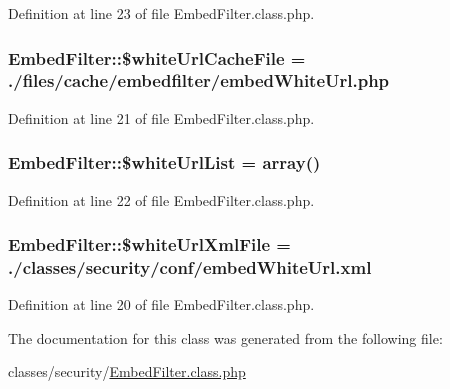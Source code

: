 Definition at line 23 of file Embed\+Filter.\+class.\+php.

\hypertarget{classEmbedFilter_a2c04bd8059ab27b14923923317ad0756}{}
\subsubsection[{\$white\+Url\+Cache\+File}]{\setlength{\rightskip}{0pt plus 5cm}Embed\+Filter\+::\$white\+Url\+Cache\+File = \textquotesingle{}./files/cache/embedfilter/embed\+White\+Url.\+php\textquotesingle{}}\label{classEmbedFilter_a2c04bd8059ab27b14923923317ad0756}


Definition at line 21 of file Embed\+Filter.\+class.\+php.

\hypertarget{classEmbedFilter_a3c991ef8c125e62213cc5c686712be8f}{}
\subsubsection[{\$white\+Url\+List}]{\setlength{\rightskip}{0pt plus 5cm}Embed\+Filter\+::\$white\+Url\+List = array()}\label{classEmbedFilter_a3c991ef8c125e62213cc5c686712be8f}


Definition at line 22 of file Embed\+Filter.\+class.\+php.

\hypertarget{classEmbedFilter_aad143e16d225c65d096f44b325744c89}{}
\subsubsection[{\$white\+Url\+Xml\+File}]{\setlength{\rightskip}{0pt plus 5cm}Embed\+Filter\+::\$white\+Url\+Xml\+File = \textquotesingle{}./classes/security/conf/embed\+White\+Url.\+xml\textquotesingle{}}\label{classEmbedFilter_aad143e16d225c65d096f44b325744c89}


Definition at line 20 of file Embed\+Filter.\+class.\+php.



The documentation for this class was generated from the following file\+:\begin{DoxyCompactItemize}
\item 
classes/security/\hyperlink{EmbedFilter_8class_8php}{Embed\+Filter.\+class.\+php}\end{DoxyCompactItemize}
